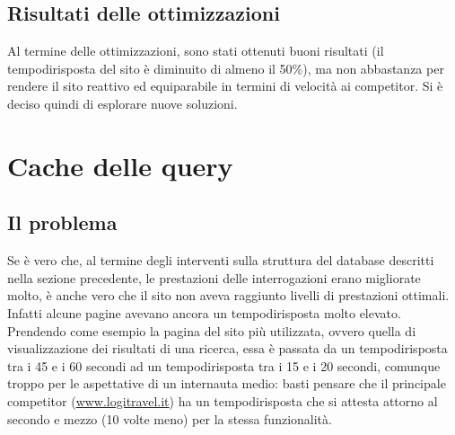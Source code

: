 \subsection{Risultati delle ottimizzazioni}
Al termine delle ottimizzazioni, sono stati ottenuti buoni risultati (il \gls{tempodirisposta} del sito è diminuito di almeno il 50\%), ma non abbastanza per rendere il sito reattivo ed equiparabile in termini di velocità ai competitor. Si è deciso quindi di esplorare nuove soluzioni.

\section{Cache delle query}
\subsection{Il problema}
Se è vero che, al termine degli interventi sulla struttura del database descritti nella sezione precedente, le prestazioni delle interrogazioni erano migliorate molto, è anche vero che il sito non aveva raggiunto livelli di prestazioni ottimali. Infatti alcune pagine avevano ancora un \gls{tempodirisposta} molto elevato. Prendendo come esempio la pagina del sito più utilizzata, ovvero quella di visualizzazione dei risultati di una ricerca, essa è passata da un \gls{tempodirisposta} tra i 45 e i 60 secondi ad un \gls{tempodirisposta} tra i 15 e i 20 secondi, comunque troppo per le aspettative di un internauta medio: basti pensare che il principale competitor (\url{www.logitravel.it}) ha un \gls{tempodirisposta} che si attesta attorno al secondo e mezzo (10 volte meno) per la stessa funzionalità.

